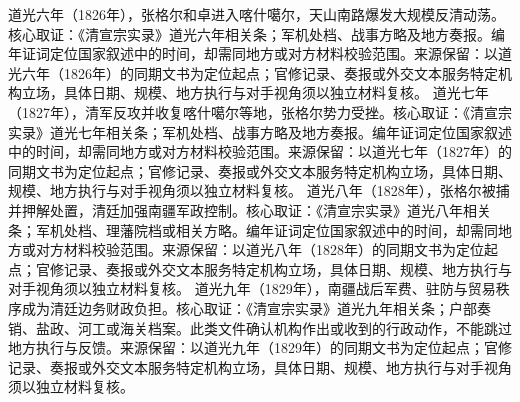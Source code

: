 道光六年（1826年），张格尔和卓进入喀什噶尔，天山南路爆发大规模反清动荡。核心取证：《清宣宗实录》道光六年相关条；军机处档、战事方略及地方奏报。编年证词定位国家叙述中的时间，却需同地方或对方材料校验范围。来源保留：以道光六年（1826年）的同期文书为定位起点；官修记录、奏报或外交文本服务特定机构立场，具体日期、规模、地方执行与对手视角须以独立材料复核。
道光七年（1827年），清军反攻并收复喀什噶尔等地，张格尔势力受挫。核心取证：《清宣宗实录》道光七年相关条；军机处档、战事方略及地方奏报。编年证词定位国家叙述中的时间，却需同地方或对方材料校验范围。来源保留：以道光七年（1827年）的同期文书为定位起点；官修记录、奏报或外交文本服务特定机构立场，具体日期、规模、地方执行与对手视角须以独立材料复核。
道光八年（1828年），张格尔被捕并押解处置，清廷加强南疆军政控制。核心取证：《清宣宗实录》道光八年相关条；军机处档、理藩院档或相关方略。编年证词定位国家叙述中的时间，却需同地方或对方材料校验范围。来源保留：以道光八年（1828年）的同期文书为定位起点；官修记录、奏报或外交文本服务特定机构立场，具体日期、规模、地方执行与对手视角须以独立材料复核。
道光九年（1829年），南疆战后军费、驻防与贸易秩序成为清廷边务财政负担。核心取证：《清宣宗实录》道光九年相关条；户部奏销、盐政、河工或海关档案。此类文件确认机构作出或收到的行政动作，不能跳过地方执行与反馈。来源保留：以道光九年（1829年）的同期文书为定位起点；官修记录、奏报或外交文本服务特定机构立场，具体日期、规模、地方执行与对手视角须以独立材料复核。
